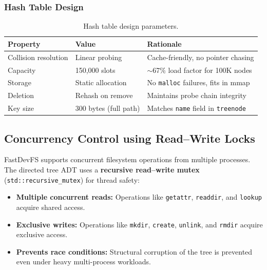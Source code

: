 \documentclass[12pt, a4paper]{article}
\begin{document}
\subsubsection{Hash Table Design}

\begin{table}[H]
\centering
\begin{tabular}{lll}
\toprule
\textbf{Property} & \textbf{Value} & \textbf{Rationale} \\
\midrule
Collision resolution & Linear probing & Cache-friendly, no pointer chasing \\
Capacity & 150,000 slots & $\sim$67\% load factor for 100K nodes \\
Storage & Static allocation & No \texttt{malloc} failures, fits in mmap \\
Deletion & Rehash on remove & Maintains probe chain integrity \\
Key size & 300 bytes (full path) & Matches \texttt{name} field in \texttt{treenode} \\
\bottomrule
\end{tabular}
\caption{Hash table design parameters.}
\end{table}

\subsection{Concurrency Control using Read--Write Locks}

FastDevFS supports concurrent filesystem operations from multiple processes. The directed tree ADT uses a \textbf{recursive read--write mutex} (\texttt{std::recursive\_mutex}) for thread safety:

\begin{itemize}
  \item \textbf{Multiple concurrent reads:} Operations like \texttt{getattr}, \texttt{readdir}, and \texttt{lookup} acquire shared access.
  \item \textbf{Exclusive writes:} Operations like \texttt{mkdir}, \texttt{create}, \texttt{unlink}, and \texttt{rmdir} acquire exclusive access.
  \item \textbf{Prevents race conditions:} Structural corruption of the tree is prevented even under heavy multi-process workloads.
\end{itemize}

\end{document}
